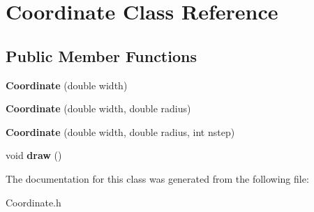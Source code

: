 \hypertarget{class_coordinate}{}\section{Coordinate Class Reference}
\label{class_coordinate}
\subsection*{Public Member Functions}
\begin{DoxyCompactItemize}
\item 
\mbox{\label{class_coordinate_a165954d2c9ca5d4b387f47da8dc22d73}} 
{\bfseries Coordinate} (double width)
\item 
\mbox{\label{class_coordinate_a3ba09b433fc40588f9982f4f432c0fce}} 
{\bfseries Coordinate} (double width, double radius)
\item 
\mbox{\label{class_coordinate_a5833a110d4e166e1d95721588fa58bde}} 
{\bfseries Coordinate} (double width, double radius, int nstep)
\item 
\mbox{\label{class_coordinate_ade43612d120d6a3c9c32f05e4a31c523}} 
void {\bfseries draw} ()
\end{DoxyCompactItemize}


The documentation for this class was generated from the following file\+:\begin{DoxyCompactItemize}
\item 
Coordinate.\+h\end{DoxyCompactItemize}
